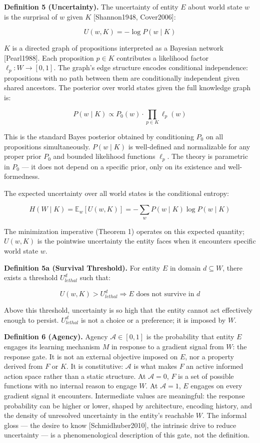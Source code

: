 \documentclass[
]{article}
\begin{document}
\textbf{Definition 5 (Uncertainty).} The uncertainty of entity \(E\)
about world state \(w\) is the surprisal of \(w\) given \(K\)
{[}Shannon1948, Cover2006{]}:

\[U(w, K) = -\log P(w \mid K)\]

\(K\) is a directed graph of propositions interpreted as a Bayesian
network {[}Pearl1988{]}. Each proposition \(p \in K\) contributes a
likelihood factor \(\ell_p : W \to [0,1]\). The graph's edge structure
encodes conditional independence: propositions with no path between them
are conditionally independent given shared ancestors. The posterior over
world states given the full knowledge graph is:

\[P(w \mid K) \propto P_0(w) \cdot \prod_{p \in K} \ell_p(w)\]

This is the standard Bayes posterior obtained by conditioning \(P_0\) on
all propositions simultaneously. \(P(w \mid K)\) is well-defined and
normalizable for any proper prior \(P_0\) and bounded likelihood
functions \(\ell_p\). The theory is parametric in \(P_0\) --- it does
not depend on a specific prior, only on its existence and
well-formedness.

The expected uncertainty over all world states is the conditional
entropy:

\[H(W \mid K) = \mathbb{E}_w[U(w, K)] = -\sum_w P(w \mid K) \log P(w \mid K)\]

The minimization imperative (Theorem 1) operates on this expected
quantity; \(U(w, K)\) is the pointwise uncertainty the entity faces when
it encounters specific world state \(w\).

\textbf{Definition 5a (Survival Threshold).} For entity \(E\) in domain
\(d \subseteq W\), there exists a threshold \(U_{lethal}^d\) such that:

\[U(w, K) > U_{lethal}^d \Rightarrow E \text{ does not survive in } d\]

Above this threshold, uncertainty is so high that the entity cannot act
effectively enough to persist. \(U_{lethal}^d\) is not a choice or a
preference; it is imposed by \(W\).

\textbf{Definition 6 (Agency).} Agency \(\mathcal{A} \in [0, 1]\) is the
probability that entity \(E\) engages its learning mechanism \(M\) in
response to a gradient signal from \(W\): the response gate. It is not
an external objective imposed on \(E\), nor a property derived from
\(F\) or \(K\). It is constitutive: \(\mathcal{A}\) is what makes \(F\)
an active informed action space rather than a static structure. At
\(\mathcal{A} = 0\), \(F\) is a set of possible functions with no
internal reason to engage \(W\). At \(\mathcal{A} = 1\), \(E\) engages
on every gradient signal it encounters. Intermediate values are
meaningful: the response probability can be higher or lower, shaped by
architecture, encoding history, and the density of unresolved
uncertainty in the entity's reachable \(W\). The informal gloss --- the
desire to know {[}Schmidhuber2010{]}, the intrinsic drive to reduce
uncertainty --- is a phenomenological description of this gate, not the
definition.
\end{document}
